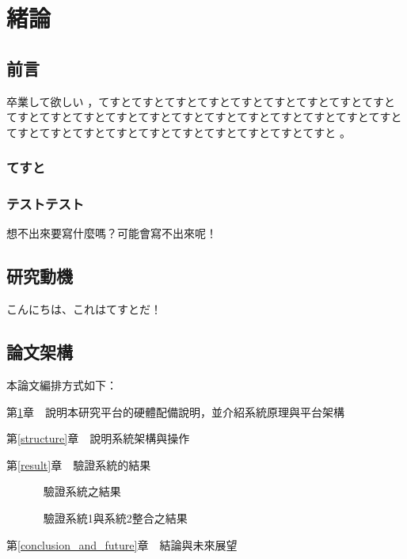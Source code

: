 
\chapter{緒論}\label{explanation}


\section{前言}\label{1-1}
卒業して欲しい \cite{m1} ，てすとてすとてすとてすとてすとてすとてすとてすとてすとてすとてすとてすとてすとてすとてすとてすとてすとてすとてすとてすとてすとてすとてすとてすとてすとてすとてすとてすとてすとてすとてすと\cite{talbot97} 。

\subsection{てすと}


\subsection{テストテスト}
想不出來要寫什麼嗎？可能會寫不出來呢！\cite{goossens97}

\newpage

\section{研究動機}\label{1-2}
こんにちは、これはてすとだ！

\newpage

\section{論文架構}\label{1-3}

\n 本論文編排方式如下：

第\ref{explanation}章　說明本研究平台的硬體配備說明，並介紹系統原理與平台架構

第\ref{structure}章　說明系統架構與操作

第\ref{result}章　驗證系統的結果
		
　　　      驗證系統之結果

　　　      驗證系統1與系統2整合之結果

第\ref{conclusion_and_future}章　結論與未來展望
